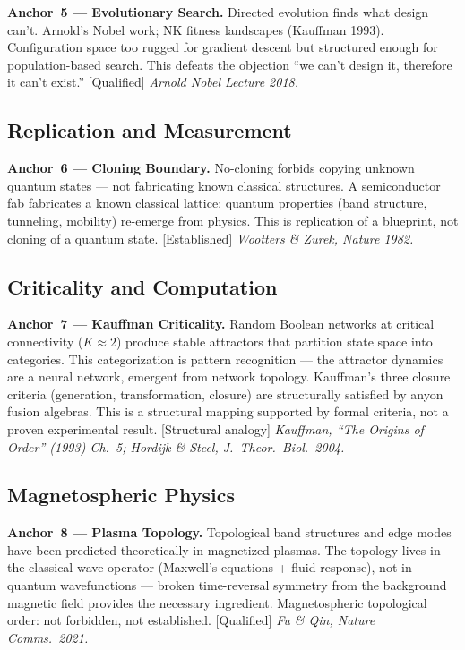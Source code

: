 \textbf{Anchor~5 --- Evolutionary Search.} Directed evolution finds what design can't. Arnold's Nobel work; NK fitness landscapes (Kauffman 1993). Configuration space too rugged for gradient descent but structured enough for population-based search. This defeats the objection ``we can't design it, therefore it can't exist.'' [Qualified]
\textit{Arnold Nobel Lecture 2018.}

\subsection*{Replication and Measurement}

\textbf{Anchor~6 --- Cloning Boundary.} No-cloning forbids copying unknown quantum states --- not fabricating known classical structures. A semiconductor fab fabricates a known classical lattice; quantum properties (band structure, tunneling, mobility) re-emerge from physics. This is replication of a blueprint, not cloning of a quantum state. [Established]
\textit{Wootters \& Zurek, Nature 1982.}

\subsection*{Criticality and Computation}

\textbf{Anchor~7 --- Kauffman Criticality.} Random Boolean networks at critical connectivity ($K \approx 2$) produce stable attractors that partition state space into categories. This categorization is pattern recognition --- the attractor dynamics are a neural network, emergent from network topology. Kauffman's three closure criteria (generation, transformation, closure) are structurally satisfied by anyon fusion algebras. This is a structural mapping supported by formal criteria, not a proven experimental result. [Structural analogy]
\textit{Kauffman, ``The Origins of Order'' (1993) Ch.~5; Hordijk \& Steel, J.\ Theor.\ Biol.\ 2004.}

\subsection*{Magnetospheric Physics}

\textbf{Anchor~8 --- Plasma Topology.} Topological band structures and edge modes have been predicted theoretically in magnetized plasmas. The topology lives in the classical wave operator (Maxwell's equations + fluid response), not in quantum wavefunctions --- broken time-reversal symmetry from the background magnetic field provides the necessary ingredient. Magnetospheric topological order: not forbidden, not established. [Qualified]
\textit{Fu \& Qin, Nature Comms.\ 2021.}

